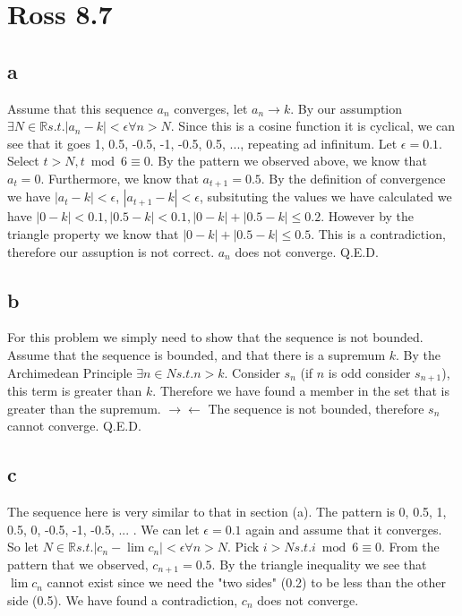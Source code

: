 \documentclass[12pt]{article}
\newcommand{\R}{\mathbb{R}}
\begin{document}
\section{Ross 8.7}
\subsection{a}
Assume that this sequence $a_n$ converges, let $a_n \to k$. By our assumption $\exists N \in \R s.t. |a_n - k|<\epsilon \forall n > N$.
Since this is a cosine function it is cyclical, we can see that it goes 1, 0.5, -0.5, -1, -0.5, 0.5, ..., repeating ad infinitum.
\newline
Let $\epsilon = 0.1$. Select $t > N, t \bmod 6 \equiv 0$. By the pattern we observed above, we know that $a_t = 0$. Furthermore, we know that $a_{t+1} = 0.5$. By the definition of convergence we have $|a_t-k|<\epsilon$, $|a_{t+1}-k|< \epsilon$, subsituting the values we have calculated we have $|0-k|<0.1, |0.5-k|<0.1, |0-k|+|0.5-k|\leq 0.2$. However by the triangle property we know that $|0-k|+|0.5-k| \leq 0.5$. This is a contradiction, therefore our assuption is not correct.
\newline
$a_n$ does not converge. Q.E.D.


\subsection{b}
For this problem we simply need to show that the sequence is not bounded.
\newline
Assume that the sequence is bounded, and that there is a supremum $k$. By the Archimedean Principle $\exists n \in N s.t. n>k$. Consider $s_n$ (if $n$ is odd consider $s_{n+1}$), this term is greater than $k$. Therefore we have found a member in the set that is greater than the supremum. $\rightarrow \leftarrow$
\newline
The sequence is not bounded, therefore $s_n$ cannot converge. Q.E.D.


\subsection{c}
The sequence here is very similar to that in section (a). The pattern is 0, 0.5, 1, 0.5, 0, -0.5, -1, -0.5, ... . We can let $\epsilon = 0.1$ again and assume that it converges. So let $N \in \R s.t. |c_n - \lim c_n| < \epsilon \forall n > N$. Pick $i > N s.t. i \bmod 6 \equiv 0$. From the pattern that we observed, $c_{n+1} = 0.5$. By the triangle inequality we see that $\lim c_n$ cannot exist since we need the "two sides" (0.2) to be less than the other side (0.5).
\newline
We have found a contradiction, $c_n$ does not converge.
\newpage
\end{document}
